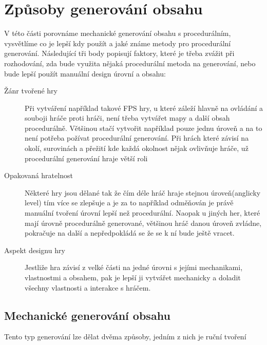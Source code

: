 \section{Způsoby generování obsahu}
V této části porovnáme mechanické generování obsahu s procedurálním, vysvětlíme co je lepší kdy použít a jaké známe metody pro procedurální generování. Následující tři body popisují faktory, které je třeba zvážit při rozhodování, zda bude využita nějaká procedurální metoda na generování, nebo bude lepší použít manuální design úrovní a obsahu:
\begin{description}
	\item[Žánr tvořené hry] Při vytváření například takové FPS hry, u které záleží hlavně na ovládání a souboji hráče proti hráči, není třeba vytvářet mapy a další obsah procedurálně. Většinou stačí vytvořit například pouze jednu úroveň a na to není potřeba požívat procedurální generování. Při hrách které závisí na okolí, surovinách a přežití kde každá okolnost nějak ovlivňuje hráče, už procedurální generování hraje větší roli
	\item[Opakovaná hratelnost] Některé hry jsou dělané tak že čím déle hráč hraje stejnou úroveň(anglicky level) tím více se zlepšuje a je za to například odměňován je právě manuální tvoření úrovní lepší než procedurální. Naopak u jiných her, které mají úrovně procedurálně generované, většinou hráč danou úroveň zvládne, pokračuje na další a nepředpokládá se že se k ní bude ještě vracet.
	\item[Aspekt designu hry] Jestliže hra závisí z velké části na jedné úrovni s jejími mechanikami, vlastnostmi a obsahem, pak je lepší ji vytvářet mechanicky a doladit všechny vlastnosti a interakce s hráčem.
\end{description}


\subsection{Mechanické generování obsahu}
Tento typ generování lze dělat dvěma způsoby, jedním z nich je ruční tvoření
\label{traditional}

